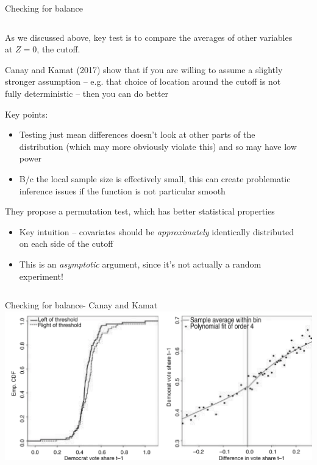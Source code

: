 \documentclass[notes,11pt, aspectratio=169]{beamer}
\newenvironment{wideitemize}{\itemize\addtolength{\itemsep}{10pt}}{\enditemize}
\begin{document}
\begin{frame}{Checking for balance}
  \begin{columns}[onlytextwidth, T] %
    \begin{column}{\textwidth}
      \begin{wideitemize}
      \item As we discussed above, key test is to compare the averages
        of other variables at $Z = 0$, the cutoff.
      \item Canay and Kamat (2017) show that if you are willing to
        assume a slightly stronger assumption -- e.g. that choice of
        location around the cutoff is not fully deterministic -- then
        you can do better
      \item Key points:
        \begin{itemize}
        \item Testing just mean differences doesn't look at other
          parts of the distribution (which may more obviously violate
          this) and so may have low power
        \item B/c the local sample size is effectively small, this can
          create problematic inference issues if the function is not
          particular smooth
        \end{itemize}
      \item They propose a permutation test, which has better
        statistical properties
        \begin{itemize}
        \item Key intuition -- covariates should be
          \emph{approximately} identically distributed on each side of
          the cutoff
        \item This is an \emph{asymptotic} argument, since it's not
          actually a random experiment!
        \end{itemize}
      \end{wideitemize}
    \end{column}%
    \hfill%
    \begin{column}{.5\textwidth}
    \end{column}%
  \end{columns}
\end{frame}

\begin{frame}{Checking for balance- Canay and Kamat}
  \includegraphics[width=\linewidth]{images/lee_rd_canay.png}
\end{frame}
\end{document}
